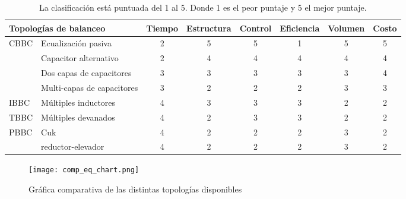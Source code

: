 \begin{table}[h!]
\begin{center}
\begin{tabular}{@{}llcccccc@{}}
\toprule
\multicolumn{2}{l}{Topolog\'ias de balanceo}                                                 & Tiempo & Estructura & Control & Eficiencia & Volumen & Costo \\ \midrule
\multirow{4}{*}{\acrshort{CBBC}} & Ecualizaci\'on pasiva                    & 2      & 5                       & 5                     & 1          & 5       & 5     \\
                                                  & Capacitor alternativo                  & 2      & 4                       & 4                     & 4          & 4       & 4     \\
                                                  & Dos capas de capacitores               & 3      & 3                       & 3                     & 3          & 3       & 4     \\
                                                  & Multi-capas de capacitores             & 3      & 2                       & 2                     & 2          & 3       & 3     \\
\acrshort{IBBC}                  & M\'ultiples inductores                   & 4      & 3                       & 3                     & 3          & 2       & 2     \\
\acrshort{TBBC}                  & M\'ultiples devanados & 4      & 2                       & 3                     & 3          & 2       & 2     \\
\multirow{2}{*}{\acrshort{PBBC}} & Cuk                                    & 4      & 2                       & 2                     & 2          & 3       & 2     \\
                                                  & reductor-elevador                      & 4      & 2                       & 2                     & 2          & 3       & 2     \\ \cmidrule(l){2-8}
\end{tabular}
\caption{La clasificaci\'on est\'a puntuada del 1 al 5. Donde 1 es el peor
    puntaje y 5 el mejor puntaje.}
\label{comp_bal_table}
\end{center}
\end{table}

\begin{figure}[h!]
    \begin{center}
        \texttt{[image: comp\_eq\_chart.png]}
        \caption{Gr\'afica comparativa de las distintas topolog\'ias disponibles}
        \label{comp_bal_results}
    \end{center}
\end{figure}
